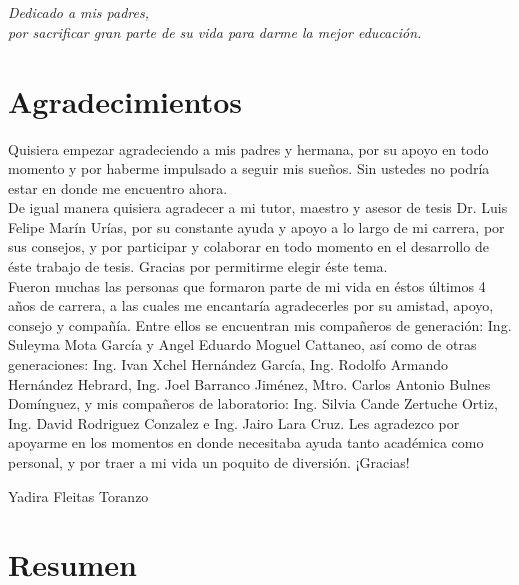 \documentclass[a4paper,openright,12pt]{report}
\begin{document}
\chapter*{}
\begin{flushright}
\textit{Dedicado a mis padres, \\ por sacrificar gran parte de su vida para darme la mejor educación.\\}
\end{flushright}

\chapter*{Agradecimientos}
Quisiera empezar agradeciendo a mis padres y hermana, por su apoyo en todo momento y por haberme impulsado a seguir mis sueños. Sin ustedes no podría estar en donde me encuentro ahora.\\

De igual manera quisiera agradecer a mi tutor, maestro y asesor de tesis Dr. Luis Felipe Marín Urías, por su constante ayuda y apoyo a lo largo de mi carrera, por sus consejos, y por participar y colaborar en todo momento en el desarrollo de éste trabajo de tesis. Gracias por permitirme elegir éste tema.\\

Fueron muchas las personas que formaron parte de mi vida en éstos últimos 4 años de carrera, a las cuales me encantaría agradecerles por su amistad, apoyo, consejo y compañía. Entre ellos se encuentran mis compañeros de generación: Ing. Suleyma Mota García y Angel Eduardo Moguel Cattaneo, así como de otras generaciones: Ing. Ivan Xchel Hernández García, Ing. Rodolfo Armando Hernández Hebrard, Ing. Joel Barranco Jiménez, Mtro. Carlos Antonio Bulnes Domínguez, y mis compañeros de laboratorio: Ing. Silvia Cande Zertuche Ortiz, Ing. David Rodriguez Conzalez e Ing. Jairo Lara Cruz. Les agradezco por apoyarme en los momentos en donde necesitaba ayuda tanto académica como personal, y por traer a mi vida un poquito de diversión. ¡Gracias!\\
\vspace*{10mm}
 
\hspace*{90mm}Yadira Fleitas Toranzo


\chapter*{Resumen}
\end{document}
